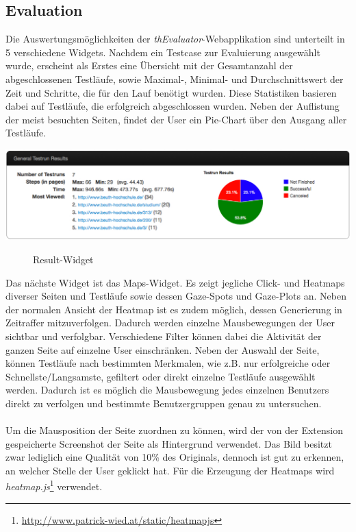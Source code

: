 \subsection{Evaluation}
\label{evaluation}

Die Auswertungsmöglichkeiten der \textit{thEvaluator}-Webapplikation sind unterteilt in 5 verschiedene Widgets. Nachdem ein Testcase zur Evaluierung ausgewählt wurde, erscheint als Erstes eine Übersicht mit der Gesamtanzahl der abgeschlossenen Testläufe, sowie Maximal-, Minimal- und Durchschnittswert der Zeit und Schritte, die für den Lauf benötigt wurden. Diese Statistiken basieren dabei auf Testläufe, die erfolgreich abgeschlossen wurden. Neben der Auflistung der meist besuchten Seiten, findet der User ein Pie-Chart über den Ausgang aller Testläufe.
\\
\begin{center}
\includegraphics[scale=0.45]{./images/resultWidget}
\end{center}
\begin{figure}[htb]
   \centering
   \caption{Result-Widget}
    \label{resultWidget}
\end{figure}

Das nächste Widget ist das Maps-Widget. Es zeigt jegliche Click- und Heatmaps diverser Seiten und Testläufe sowie dessen Gaze-Spots und Gaze-Plots an. Neben der normalen Ansicht der Heatmap ist es zudem möglich, dessen Generierung in Zeitraffer mitzuverfolgen. Dadurch werden einzelne Mausbewegungen der User sichtbar und verfolgbar. Verschiedene Filter können dabei die Aktivität der ganzen Seite auf einzelne User einschränken. Neben der Auswahl der Seite, können Testläufe nach bestimmten Merkmalen, wie z.B. \glqq nur erfolgreiche\grqq{} oder \glqq Schnellste\grqq{}/\glqq Langsamste\grqq{}, gefiltert oder direkt einzelne Testläufe ausgewählt werden. Dadurch ist es möglich die Mausbewegung jedes einzelnen Benutzers direkt zu verfolgen und bestimmte Benutzergruppen genau zu untersuchen.\\
\\
Um die Mausposition der Seite zuordnen zu können, wird der von der Extension gespeicherte Screenshot der Seite als Hintergrund verwendet. Das Bild besitzt zwar lediglich eine Qualität von 10\% des Originals, dennoch ist gut zu erkennen, an welcher Stelle der User geklickt hat. Für die Erzeugung der Heatmaps wird \textit{heatmap.js}\footnote{\url{http://www.patrick-wied.at/static/heatmapjs}} verwendet.

